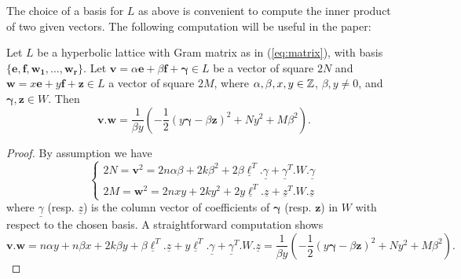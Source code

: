 \documentclass[11pt,letterpaper]{amsart}
\newcommand{\vect}[1]{\boldsymbol{#1}}
\begin{document}
The choice of a basis for $L$ as above is convenient to compute the inner product of two given vectors. The following computation will be useful in the paper:

\begin{lemma} \label{lemma:computation}
Let $L$ be a hyperbolic lattice with Gram matrix as in (\ref{eq:matrix}), with basis $\{\vect{e},\vect{f},\vect{w_1},\ldots,\vect{w_r}\}$.
Let $\vect{v}=\alpha \vect{e} + \beta \vect{f} + \vect{\gamma}\in L$ be a vector of square $2N$ and $\vect{w}=x\vect{e}+y\vect{f}+\vect{z}\in L$ a vector of square $2M$, where $\alpha,\beta,x,y\in \mathbb{Z}$, $\beta,y\ne 0$, and $\vect{\gamma},\vect{z}\in W$. Then
$$\vect{v}.\vect{w} = \frac{1}{\beta y}\left( -\frac{1}{2}(y\vect{\gamma}-\beta\vect{z})^2 + Ny^2 + M\beta^2 \right).$$
\end{lemma}
\begin{proof}
By assumption we have
$$\begin{cases}
2N=\vect{v}^2 = 2n\alpha\beta + 2k\beta^2 + 2\beta \underline{\ell}^T . \underline{\gamma} + \underline{\gamma}^T.W.\underline{\gamma}\\
2M = \vect{w}^2 = 2nxy +2ky^2+2y \underline{\ell}^T. \underline{z} + \underline{z}^T.W.\underline{z}
\end{cases}$$
where $\underline{\gamma}$ (resp. $\underline{z}$) is the column vector of coefficients of $\vect{\gamma}$ (resp. $\vect{z}$) in $W$ with respect to the chosen basis.
A straightforward computation shows
$$\vect{v}.\vect{w} = n\alpha y + n\beta x +2k \beta y +\beta \underline{\ell}^T.\underline{z} + y \underline{\ell}^T.\underline{\gamma}+\underline{\gamma}^T.W.\underline{z}=\frac{1}{\beta y}\left( -\frac{1}{2}(y\vect{\gamma}-\beta\vect{z})^2 + Ny^2 + M\beta^2 \right).$$


\end{proof}
\end{document}
